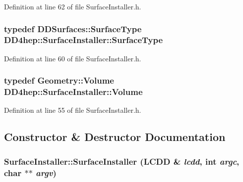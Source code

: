 Definition at line 62 of file SurfaceInstaller.h.\hypertarget{class_d_d4hep_1_1_surface_installer_a8989d1da18081ccd8afbe70a21d0c918}{
\subsubsection[{SurfaceType}]{\setlength{\rightskip}{0pt plus 5cm}typedef {\bf DDSurfaces::SurfaceType} {\bf DD4hep::SurfaceInstaller::SurfaceType}}}
\label{class_d_d4hep_1_1_surface_installer_a8989d1da18081ccd8afbe70a21d0c918}


Definition at line 60 of file SurfaceInstaller.h.\hypertarget{class_d_d4hep_1_1_surface_installer_a32a727cbf3cfca5204b7eaf344a5304f}{
\subsubsection[{Volume}]{\setlength{\rightskip}{0pt plus 5cm}typedef {\bf Geometry::Volume} {\bf DD4hep::SurfaceInstaller::Volume}}}
\label{class_d_d4hep_1_1_surface_installer_a32a727cbf3cfca5204b7eaf344a5304f}


Definition at line 55 of file SurfaceInstaller.h.

\subsection{Constructor \& Destructor Documentation}
\hypertarget{class_d_d4hep_1_1_surface_installer_a3d66822b1627a31f133d29f0c330b82c}{
\subsubsection[{SurfaceInstaller}]{\setlength{\rightskip}{0pt plus 5cm}SurfaceInstaller::SurfaceInstaller ({\bf LCDD} \& {\em lcdd}, \/  int {\em argc}, \/  char $\ast$$\ast$ {\em argv})}}
\label{class_d_d4hep_1_1_surface_installer_a3d66822b1627a31f133d29f0c330b82c}



